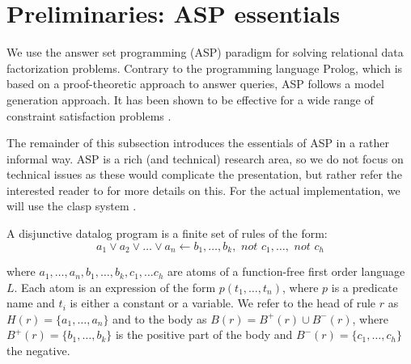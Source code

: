 \section{Preliminaries: ASP essentials}\label{section:asp}

We use the answer set programming (ASP) paradigm for solving relational data factorization problems. Contrary to the programming language Prolog, which is based on a proof-theoretic approach to answer queries, ASP follows a model generation approach. It has been shown to be effective for a wide range of constraint satisfaction problems \citep{aspbook}.

The remainder of this subsection introduces the essentials of ASP in a rather informal way. ASP is a rich (and technical) research area, so we do not focus on technical issues as these would complicate the presentation, but rather refer the interested reader to \citet{aspbook,eiter,leone,DBLP:conf/aaai/Lifschitz08} for more details on this. For the actual implementation, we will use the clasp system \citep{aspbook,BrewkaCACM}.


\begin{definition}
  A disjunctive datalog program is a finite set of rules of the form: 
  \begin{equation*}
    a_1 \vee a_2 \vee \dots \vee a_n \leftarrow b_1, \dots, b_k, \textit{ not }c_1,\dots,\textit{ not }c_h 
  \end{equation*}
\end{definition}
where $a_1, \dots, a_n, b_1, \dots, b_k,c_1, \dots c_h$ are atoms of a function-free first order language $L$. Each atom is an expression of the form $p(t_1,\ldots,t_n)$, where $p$ is a predicate name and $t_i$ is either a constant or a variable. We refer to the head of rule $r$ as $H(r) = \{a_1,\dots,a_n\}$ and to the body as $B(r) = B^{+}(r) \cup B^{-}(r)$, where $B^{+}(r) = \{ b_1, \dots, b_k \}$ is the positive part of the body and $B^{-}(r) = \{ c_1, \dots, c_h \}$ the negative. 

